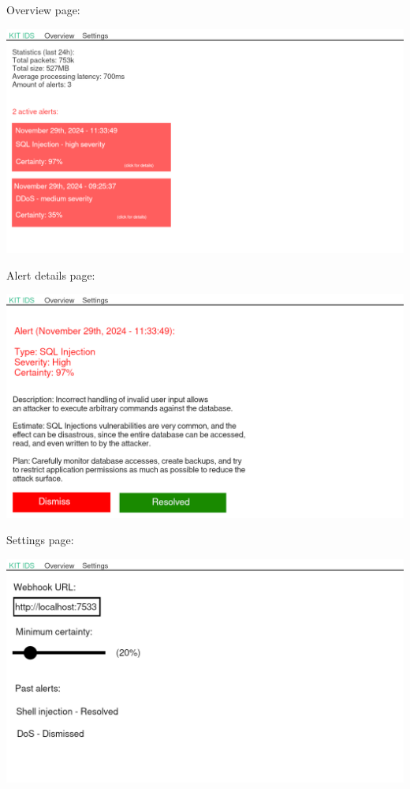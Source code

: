 \documentclass[oneside, english]{reports/assets/sdqtechreport}
\begin{document}
Overview page:

\includegraphics{ui-overview}

Alert details page:

\includegraphics{ui-details}

Settings page:

\includegraphics{ui-settings}
\end{document}
